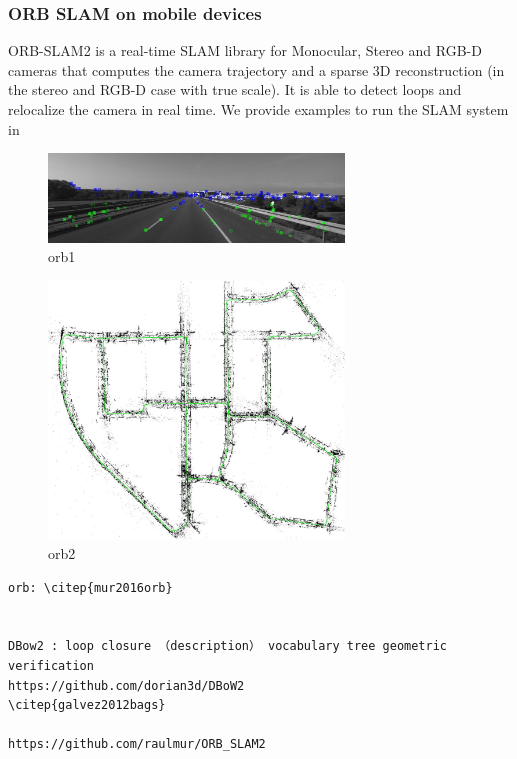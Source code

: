 \documentclass[12pt,twoside]{article}
\begin{document}
\subsubsection{ORB SLAM on mobile devices}

ORB-SLAM2 is a real-time SLAM library for Monocular, Stereo and RGB-D cameras that computes the camera trajectory and a sparse 3D reconstruction (in the stereo and RGB-D case with true scale). It is able to detect loops and relocalize the camera in real time. We provide examples to run the SLAM system in 



\begin{figure}[h]
    \centering
    \includegraphics[width=0.7\textwidth]{figures/orb1}
    \caption{orb1}
    \label{fig: orb1}
\end{figure}

\begin{figure}[h]
    \centering
    \includegraphics[width=0.7\textwidth]{figures/orb2}
    \caption{orb2}
    \label{fig: orb2}
\end{figure}


\begin{verbatim}
orb: \citep{mur2016orb}


DBow2 : loop closure （description） vocabulary tree geometric verification
https://github.com/dorian3d/DBoW2
\citep{galvez2012bags}

https://github.com/raulmur/ORB_SLAM2
\end{verbatim}
\end{document}
